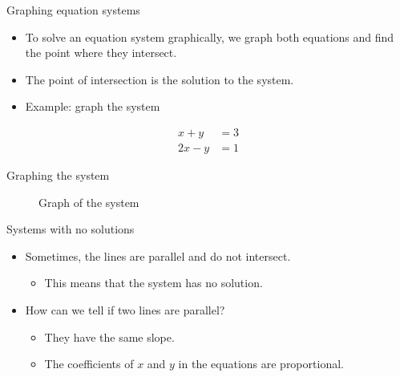 \documentclass[
  10pt,
  ignorenonframetext,
]{beamer}
\providecommand{\tightlist}{%
  \setlength{\itemsep}{0pt}\setlength{\parskip}{0pt}}\usepackage{longtable,booktabs,array}
\begin{document}
\begin{frame}{Graphing equation systems}
\label{graphing-equation-systems}
\begin{itemize}
\item
  To solve an equation system graphically, we graph both equations and
  find the point where they intersect.
\item
  The point of intersection is the solution to the system.
\item
  Example: graph the system
\end{itemize}

\begin{align*}
x + y &= 3 \\
2x - y &= 1
\end{align*}
\end{frame}

\begin{frame}{Graphing the system}
\label{graphing-the-system}
\begin{figure}
\centering
{}
\caption{Graph of the system}
\end{figure}
\end{frame}

\begin{frame}{Systems with no solutions}
\label{systems-with-no-solutions}
\begin{itemize}
\tightlist
\item
  Sometimes, the lines are parallel and do not intersect.

  \begin{itemize}
  \tightlist
  \item
    This means that the system has no solution.
  \end{itemize}
\item
  How can we tell if two lines are parallel?

  \begin{itemize}
  \tightlist
  \item
    They have the same slope.
  \item
    The coefficients of \(x\) and \(y\) in the equations are
    proportional.
  \end{itemize}
\end{itemize}
\end{frame}
\end{document}
